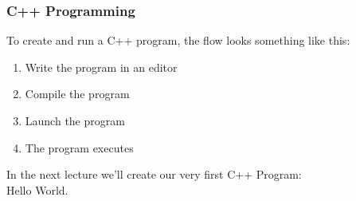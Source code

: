 \begin{frame}
\frametitle{C++ Programming}
To create and run a C++ program, the flow looks something like this:

\begin{enumerate}
	\item Write the program in an editor
	\item Compile the program
	\item Launch the program
	\item The program executes
\end{enumerate}

In the next lecture we'll create our very first C++ Program:\\
\quad Hello World.

\end{frame}





